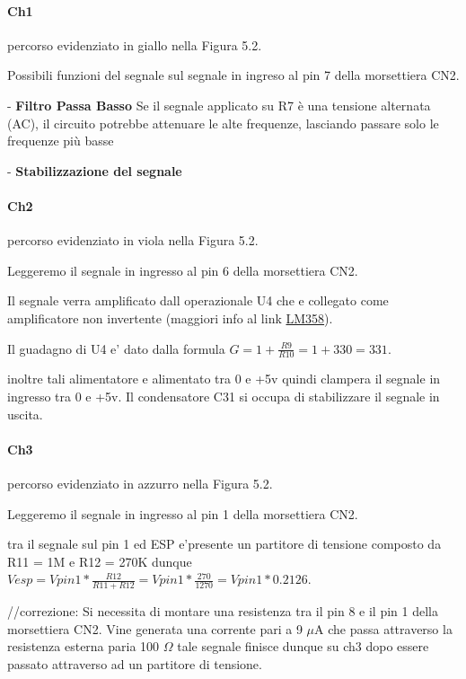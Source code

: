 \documentclass[12pt,a4paper]{report}
\begin{document}
\paragraph{Ch1}
percorso evidenziato in giallo nella Figura 5.2.

Possibili funzioni del segnale sul segnale in ingreso al pin 7 della morsettiera CN2.

- \textbf{Filtro Passa Basso}
Se il segnale applicato su R7 è una tensione alternata (AC), il circuito potrebbe attenuare le alte frequenze, lasciando passare solo le frequenze più basse

- \textbf{Stabilizzazione del segnale}

\paragraph{Ch2}
percorso evidenziato in viola nella Figura 5.2.

Leggeremo il segnale in ingresso al pin 6 della morsettiera CN2.

Il segnale verra amplificato dall operazionale U4 che e collegato come amplificatore non invertente (maggiori info al link \href{https://elettronicasemplice.weebly.com/amplificatore-operazionale-non-invertente.html}{LM358}).

Il guadagno di U4 e' dato dalla formula $G = 1 + \frac{R9}{R10}= 1+330 = 331 $.

inoltre tali alimentatore e alimentato tra 0 e +5v quindi clampera il segnale in ingresso tra 0 e +5v.
Il condensatore C31 si occupa di stabilizzare il segnale in uscita.

\paragraph{Ch3}
percorso evidenziato in azzurro nella Figura 5.2.

Leggeremo il segnale in ingresso al pin 1 della morsettiera CN2.

tra il segnale sul pin 1 ed ESP e'presente un partitore di tensione composto da R11 = 1M e R12 = 270K dunque $Vesp = Vpin1 * \frac{R12}{R11+R12} = Vpin1 * \frac{270}{1270} = Vpin1 * 0.2126$.

//correzione:
Si necessita di montare una resistenza tra il pin 8 e il pin 1 della morsettiera CN2.
Vine generata una corrente pari a 9 $\mu$A che passa attraverso la resistenza esterna paria 100 $\Omega$
tale segnale finisce dunque su ch3 dopo essere passato attraverso ad un partitore di tensione.
\end{document}
